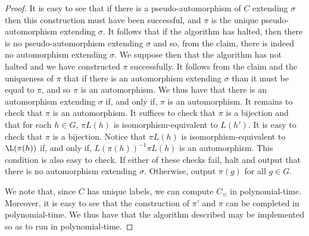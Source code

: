 \documentclass[../paper.tex]{subfiles}
\begin{document}
\begin{proof}
It is easy to see that if there is a pseudo-automorphism of $C$ extending
$\sigma$ then this construction must have been successful, and $\pi$ is the
unique pseudo-automorphism extending $\sigma$. It follows that if the algorithm
has halted, then there is no pseudo-automorphism extending $\sigma$ and so, from
the claim, there is indeed no automorphism extending $\sigma$. We suppose then
that the algorithm has not halted and we have constructed $\pi$ successfully. It
follows from the claim and the uniqueness of $\pi$ that if there is an
automorphism extending $\sigma$ than it must be equal to $\pi$, and so $\pi$ is
an automorphism. We thus have that there is an automorphism extending $\sigma$
if, and only if, $\pi$ is an automorphism. It remains to check that $\pi$ is an
automorphism. It suffices to check that $\pi$ is a bijection and that for each
$h \in G$, $\pi L(h)$ is isomorphism-equivalent to $L(h')$. It is easy to check
that $\pi$ is a bijection. Notice that $\pi L(h)$ is isomorphism-equivalent to
$\L(\pi(h))$ if, and only if, $L(\pi(h))^{-1}\pi L(h)$ is an automorphism. This
condition is also easy to check. If either of these checks fail, halt and output
that there is no automorphism extending $\sigma$. Otherwise, output $\pi (g)$
for all $g \in G$.

We note that, since $C$ has unique labels, we can compute $C_\equiv$ in
polynomial-time. Moreover, it is easy to see that the construction of $\pi'$ and
$\pi$ can be completed in polynomial-time. We thus have that the algorithm
described may be implemented so as to run in polynomial-time.
\end{proof}


\end{document}

